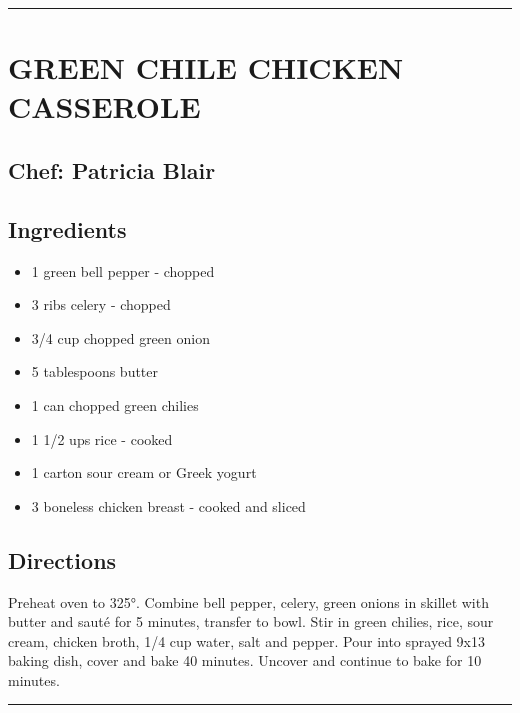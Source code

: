 \documentclass[
]{book}
\providecommand{\tightlist}{%
  \setlength{\itemsep}{0pt}\setlength{\parskip}{0pt}}
\begin{document}
\begin{center}\rule{0.5\linewidth}{0.5pt}\end{center}

\hypertarget{green-chile-chicken-casserole}{%
\section*{GREEN CHILE CHICKEN CASSEROLE}\label{green-chile-chicken-casserole}}


\hypertarget{chef-patricia-blair-12}{%
\subsection*{Chef: Patricia Blair}\label{chef-patricia-blair-12}}


\hypertarget{ingredients-57}{%
\subsection*{Ingredients}\label{ingredients-57}}


\begin{itemize}
\tightlist
\item
  1 green bell pepper - chopped
\item
  3 ribs celery - chopped
\item
  3/4 cup chopped green onion
\item
  5 tablespoons butter
\item
  1 can chopped green chilies
\item
  1 1/2 ups rice - cooked
\item
  1 carton sour cream or Greek yogurt
\item
  3 boneless chicken breast - cooked and sliced
\end{itemize}

\hypertarget{directions-57}{%
\subsection*{Directions}\label{directions-57}}


Preheat oven to 325°. Combine bell pepper, celery, green onions in skillet with butter and sauté for 5 minutes, transfer to bowl. Stir in green chilies, rice, sour cream, chicken broth, 1/4 cup water, salt and pepper. Pour into sprayed 9x13 baking dish, cover and bake 40 minutes. Uncover and continue to bake for 10 minutes.

\begin{center}\rule{0.5\linewidth}{0.5pt}\end{center}
\end{document}

